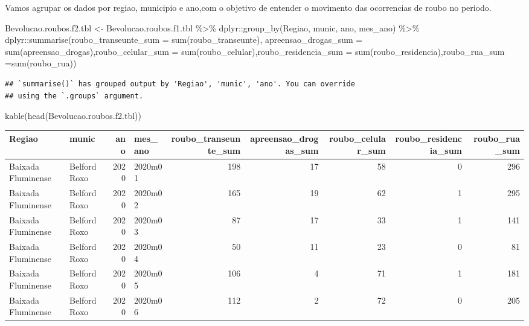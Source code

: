 \documentclass[
]{article}
\newenvironment{Shaded}{\begin{snugshade}}{\end{snugshade}}
\newcommand{\AttributeTok}[1]{\textcolor[rgb]{0.77,0.63,0.00}{#1}}
\newcommand{\FunctionTok}[1]{\textcolor[rgb]{0.00,0.00,0.00}{#1}}
\newcommand{\NormalTok}[1]{#1}
\newcommand{\OtherTok}[1]{\textcolor[rgb]{0.56,0.35,0.01}{#1}}
\newcommand{\SpecialCharTok}[1]{\textcolor[rgb]{0.00,0.00,0.00}{#1}}
\begin{document}
Vamos agrupar os dados por regiao, municipio e ano,com o objetivo de entender o movimento das ocorrencias de roubo no periodo.

\begin{Shaded}
\begin{Highlighting}[]
\NormalTok{Bevolucao.roubos.f2.tbl }\OtherTok{\textless{}{-}}\NormalTok{ Bevolucao.roubos.f1.tbl }\SpecialCharTok{\%\textgreater{}\%}\NormalTok{ dplyr}\SpecialCharTok{::}\FunctionTok{group\_by}\NormalTok{(Regiao, munic, ano, mes\_ano) }\SpecialCharTok{\%\textgreater{}\%}\NormalTok{ dplyr}\SpecialCharTok{::}\FunctionTok{summarise}\NormalTok{(}\AttributeTok{roubo\_transeunte\_sum =} \FunctionTok{sum}\NormalTok{(roubo\_transeunte), }\AttributeTok{apreensao\_drogas\_sum =} \FunctionTok{sum}\NormalTok{(apreensao\_drogas),}\AttributeTok{roubo\_celular\_sum =} \FunctionTok{sum}\NormalTok{(roubo\_celular),}\AttributeTok{roubo\_residencia\_sum =} \FunctionTok{sum}\NormalTok{(roubo\_residencia),}\AttributeTok{roubo\_rua\_sum =}\FunctionTok{sum}\NormalTok{(roubo\_rua))}
\end{Highlighting}
\end{Shaded}

\begin{verbatim}
## `summarise()` has grouped output by 'Regiao', 'munic', 'ano'. You can override
## using the `.groups` argument.
\end{verbatim}

\begin{Shaded}
\begin{Highlighting}[]
\FunctionTok{kable}\NormalTok{(}\FunctionTok{head}\NormalTok{(Bevolucao.roubos.f2.tbl))}
\end{Highlighting}
\end{Shaded}

\begin{tabular}{l|l|r|l|r|r|r|r|r}
\hline
Regiao & munic & ano & mes\_ano & roubo\_transeunte\_sum & apreensao\_drogas\_sum & roubo\_celular\_sum & roubo\_residencia\_sum & roubo\_rua\_sum\\
\hline
Baixada Fluminense & Belford Roxo & 2020 & 2020m01 & 198 & 17 & 58 & 0 & 296\\
\hline
Baixada Fluminense & Belford Roxo & 2020 & 2020m02 & 165 & 19 & 62 & 1 & 295\\
\hline
Baixada Fluminense & Belford Roxo & 2020 & 2020m03 & 87 & 17 & 33 & 1 & 141\\
\hline
Baixada Fluminense & Belford Roxo & 2020 & 2020m04 & 50 & 11 & 23 & 0 & 81\\
\hline
Baixada Fluminense & Belford Roxo & 2020 & 2020m05 & 106 & 4 & 71 & 1 & 181\\
\hline
Baixada Fluminense & Belford Roxo & 2020 & 2020m06 & 112 & 2 & 72 & 0 & 205\\
\hline
\end{tabular}
\end{document}
